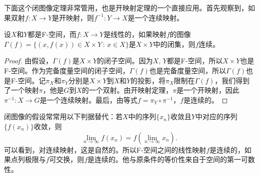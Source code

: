 下面这个闭图像定理非常管用，也是开映射定理的一个直接应用。首先观察到，如果双射$f:X\to Y$是开映射，则$f^{-1}:Y\to X$是一个连续映射。

\begin{thm}[闭图像定理]
设$X$和$Y$都是F-空间，而$f:X\to Y$是线性的，如果映射$f$的图像$\Gamma(f)=\{(x,f(x))\in X\times Y\,:\, x\in X\}$是$X\times Y$中的闭集，则$f$连续。
\end{thm}

\begin{proof}
	由假设，$\Gamma(f)$是$X\times Y$的闭子空间。因为$X$, $Y$都是F-空间，所以$X\times Y$也是F-空间。作为完备度量空间的闭子空间，$\Gamma(f)$也是完备度量空间，所以$\Gamma(f)$也是F-空间。记$\pi_X$和$\pi_Y$分别是$X\times Y$到$X$和$Y$的投影，将$\pi_X$限制在$\Gamma(f)$，我们得到了一个映射$\pi$，他是$G$到$X$的一个双射。由开映射定理，$\pi$是一个开映射，因此$\pi^{-1}:X\to G$是一个连续映射。最后，由等式$f=\pi_Y\circ \pi^{-1}$，$f$是连续的。
\end{proof}

闭图像的假设常常用以下判据替代：若$X$中的序列$\{x_n\}$收敛且$Y$中对应的序列$\{f(x_n)\}$收敛，则
\[
	\lim_{n\to \infty}f(x_n)=f\left(\lim_{n\to \infty} x_n\right).
\]
可以看到，对连续映射，这是自然的。所以F-空间之间的线性映射$f$是连续的，如果点列极限与$f$可交换，则$f$是连续的。他与原条件的等价性来自于空间的第一可数性。
